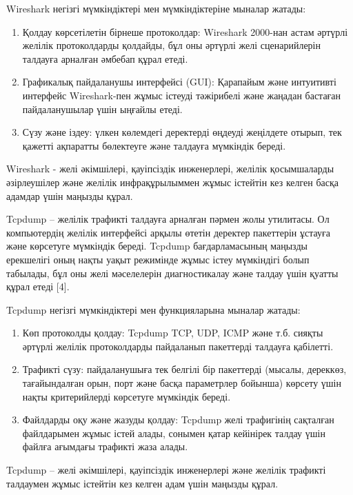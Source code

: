 \begin{multicols}{2}
Wireshark негізгі мүмкіндіктері мен мүмкіндіктеріне мыналар жатады:

\begin{enumerate}
\def\labelenumi{\arabic{enumi}.}
\item
  Қолдау көрсетілетін бірнеше протоколдар: Wireshark 2000-нан астам
  әртүрлі желілік протоколдарды қолдайды, бұл оны әртүрлі желі
  сценарийлерін талдауға арналған әмбебап құрал етеді.
\item
  Графикалық пайдаланушы интерфейсі (GUI): Қарапайым және интуитивті
  интерфейс Wireshark-пен жұмыс істеуді тәжірибелі және жаңадан бастаған
  пайдаланушылар үшін ыңғайлы етеді.
\item
  Сүзу және іздеу: үлкен көлемдегі деректерді өңдеуді жеңілдете отырып,
  тек қажетті ақпаратты бөлектеуге және талдауға мүмкіндік береді.
\end{enumerate}

Wireshark - желі әкімшілері, қауіпсіздік инженерлері, желілік
қосымшаларды әзірлеушілер және желілік инфрақұрылыммен жұмыс істейтін
кез келген басқа адамдар үшін маңызды құрал.

Tcpdump -- желілік трафикті талдауға арналған пәрмен жолы утилитасы. Ол
компьютердің желілік интерфейсі арқылы өтетін деректер пакеттерін
ұстауға және көрсетуге мүмкіндік береді. Tcpdump бағдарламасының маңызды
ерекшелігі оның нақты уақыт режимінде жұмыс істеу мүмкіндігі болып
табылады, бұл оны желі мәселелерін диагностикалау және талдау үшін
қуатты құрал етеді {[}4{]}.

Tcpdump негізгі мүмкіндіктері мен функцияларына мыналар жатады:

\begin{enumerate}
\def\labelenumi{\arabic{enumi}.}
\item
  Көп протоколды қолдау: Tcpdump TCP, UDP, ICMP және т.б. сияқты әртүрлі
  желілік протоколдарды пайдаланып пакеттерді талдауға қабілетті.
\item
  Трафикті сүзу: пайдаланушыға тек белгілі бір пакеттерді (мысалы,
  дереккөз, тағайындалған орын, порт және басқа параметрлер бойынша)
  көрсету үшін нақты критерийлерді көрсетуге мүмкіндік береді.
\item
  Файлдарды оқу және жазуды қолдау: Tcpdump желі трафигінің сақталған
  файлдарымен жұмыс істей алады, сонымен қатар кейінірек талдау үшін
  файлға ағымдағы трафикті жаза алады.
\end{enumerate}

Tcpdump -- желі әкімшілері, қауіпсіздік инженерлері және желілік
трафикті талдаумен жұмыс істейтін кез келген адам үшін маңызды құрал.


\end{multicols}
